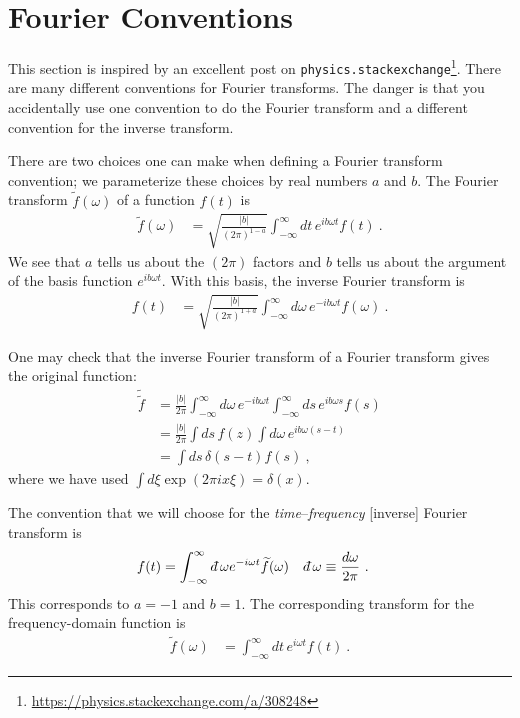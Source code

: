 
\section{Fourier Conventions}
\label{app:Fourier}

This section is inspired by an excellent post on \texttt{physics.stackexchange}\footnote{\url{https://physics.stackexchange.com/a/308248}}. There are many different conventions for Fourier transforms. The danger is that you accidentally use one convention to do the Fourier transform and a different convention for the inverse transform. 

There are two choices one can make when defining a Fourier transform convention; we parameterize these choices by real numbers $a$ and $b$. The Fourier transform $\tilde f(\omega)$ of a function $f(t)$ is
\begin{align}
	\tilde f(\omega)
	&= 
	\sqrt{\frac{|b|}{(2\pi)^{1-a}}}
	\int_{-\infty}^\infty dt\, e^{ib\omega t} f(t) \ .
\end{align}
We see that $a$ tells us about the $(2\pi)$ factors and $b$ tells us about the argument of the basis function $e^{ib\omega t}$. With this basis, the inverse Fourier transform is 
\begin{align}
	f(t)&=
	\sqrt{\frac{|b|}{(2\pi)^{1+a}}}
	\int_{-\infty}^\infty d\omega\, e^{-ib\omega t} f(\omega) \ .
\end{align}

One may check that the inverse Fourier transform of a Fourier transform gives the original function:
\begin{align}
	\tilde{\tilde f} &=
	\frac{|b|}{2\pi}
	\int_{-\infty}^\infty d\omega\, e^{-ib\omega t}
	\int_{-\infty}^{\infty}
	ds\, e^{ib\omega s} f(s)
	\\
	&= 
	\frac{|b|}{2\pi}
	\int ds\, f(z) \int d\omega \, e^{ib\omega(s-t)}
	\\
	&= \int ds\, \delta(s-t) f(s) \ ,
\end{align}
where we have used $\int d\xi \exp(2\pi i x\xi) = \delta(x)$. 

The convention that we will choose for the \emph{time}--\emph{frequency} [inverse] Fourier transform is
\begin{align}
	f(t) &= \int_{-\infty}^{\infty} \dbar\omega e^{-i\omega t} \tilde f(\omega)
	&
	\dbar \omega &\equiv\frac{d\omega}{2\pi} \ .
\end{align}
This corresponds to $a=-1$ and $b=1$. The corresponding transform for the frequency-domain function is
\begin{align}
	\tilde f(\omega) &= 
	\int_{-\infty}^\infty d t\, e^{i\omega t} f(t) \ .
\end{align}


